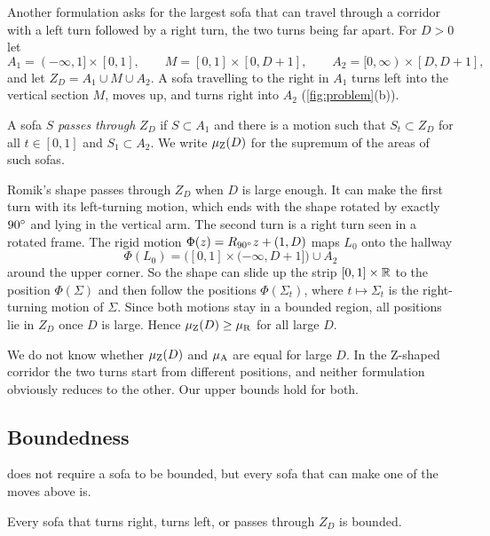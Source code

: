 Another formulation \cite{optimisation-constants-repo} asks for the largest sofa that can travel through a corridor with a left turn followed by a right turn, the two turns being far apart. For $D>0$ let
\[
A_1=(-\infty,1]\times[0,1],\qquad M=[0,1]\times[0,D+1],\qquad A_2=[0,\infty)\times[D,D+1],
\]
and let $Z_D=A_1\cup M\cup A_2$. A sofa travelling to the right in $A_1$ turns left into the vertical section $M$, moves up, and turns right into $A_2$ (\cref{fig:problem}(b)).

\begin{defn}\label{def:z}
A sofa $S$ \emph{passes through} $Z_D$ if $S\subset A_1$ and there is a motion such that $S_t\subset Z_D$ for all $t\in[0,1]$ and $S_1\subset A_2$. We write $\mu_{\mathrm{Z}}(D)$ for the supremum of the areas of such sofas.
\end{defn}

Romik's shape passes through $Z_D$ when $D$ is large enough. It can make the first turn with its left-turning motion, which ends with the shape rotated by exactly $90^{\circ}$ and lying in the vertical arm. The second turn is a right turn seen in a rotated frame. The rigid motion $\Phi(z)=R_{90^{\circ}}z+(1,D)$ maps $L_0$ onto the hallway
\[
\Phi(L_0)=\big([0,1]\times(-\infty,D+1]\big)\cup A_2
\]
around the upper corner. So the shape can slide up the strip $[0,1]\times\mathbb{R}$ to the position $\Phi(\Sigma)$ and then follow the positions $\Phi(\Sigma_t)$, where $t\mapsto\Sigma_t$ is the right-turning motion of $\Sigma$. Since both motions stay in a bounded region, all positions lie in $Z_D$ once $D$ is large. Hence $\mu_{\mathrm{Z}}(D)\ge\mu_{\mathrm{R}}$ for all large $D$.

We do not know whether $\mu_{\mathrm{Z}}(D)$ and $\mu_{\mathrm{A}}$ are equal for large $D$. In the Z-shaped corridor the two turns start from different positions, and neither formulation obviously reduces to the other. Our upper bounds hold for both.

\subsection{Boundedness}

 does not require a sofa to be bounded, but every sofa that can make one of the moves above is.

\begin{lem}\label{lem:bounded}
Every sofa that turns right, turns left, or passes through $Z_D$ is bounded.
\end{lem}

